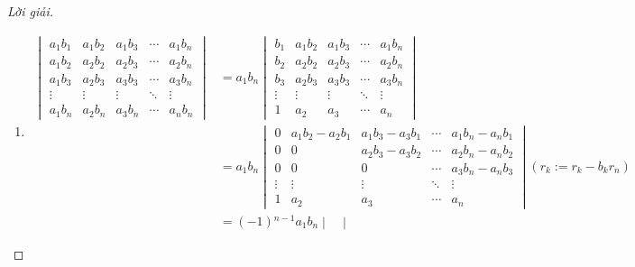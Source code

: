 \documentclass[class=linear-algebra,crop=false]{standalone}
\begin{document}
\begin{proof}[Lời giải]
	\begin{enumerate}[label = (\alph*)]
		\item
		      \begin{align*}
			      \begin{vmatrix}
				      a_{1}b_{1} & a_{1}b_{2} & a_{1}b_{3} & \cdots & a_{1}b_{n} \\
				      a_{1}b_{2} & a_{2}b_{2} & a_{2}b_{3} & \cdots & a_{2}b_{n} \\
				      a_{1}b_{3} & a_{2}b_{3} & a_{3}b_{3} & \cdots & a_{3}b_{n} \\
				      \vdots     & \vdots     & \vdots     & \ddots & \vdots     \\
				      a_{1}b_{n} & a_{2}b_{n} & a_{3}b_{n} & \cdots & a_{n}b_{n}
			      \end{vmatrix}
			       & =
			      a_{1}b_{n}
			      \begin{vmatrix}
				      b_{1}  & a_{1}b_{2} & a_{1}b_{3} & \cdots & a_{1}b_{n} \\
				      b_{2}  & a_{2}b_{2} & a_{2}b_{3} & \cdots & a_{2}b_{n} \\
				      b_{3}  & a_{2}b_{3} & a_{3}b_{3} & \cdots & a_{3}b_{n} \\
				      \vdots & \vdots     & \vdots     & \ddots & \vdots     \\
				      1      & a_{2}      & a_{3}      & \cdots & a_{n}
			      \end{vmatrix}                                            \\
			       & =
			      a_{1}b_{n}
			      \begin{vmatrix}
				      0      & a_{1}b_{2} - a_{2}b_{1} & a_{1}b_{3} - a_{3}b_{1} & \cdots & a_{1}b_{n} - a_{n}b_{1} \\
				      0      & 0                       & a_{2}b_{3} - a_{3}b_{2} & \cdots & a_{2}b_{n} - a_{n}b_{2} \\
				      0      & 0                       & 0                       & \cdots & a_{3}b_{n} - a_{n}b_{3} \\
				      \vdots & \vdots                  & \vdots                  & \ddots & \vdots                  \\
				      1      & a_{2}                   & a_{3}                   & \cdots & a_{n}
			      \end{vmatrix} (r_{k}:= r_{k} - b_{k}r_{n})     \\
			       & =
			      (-1){}^{n-1}a_{1}b_{n}
			      \begin{vmatrix}

\end{vmatrix}
\end{align*}
\end{enumerate}
\end{proof}
\end{document}
